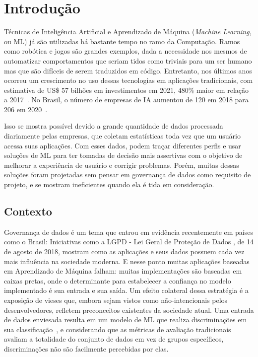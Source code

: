 \documentclass[portugues]{ic-tese}
\begin{document}
\mainmatter


\chapter{Introdução}


Técnicas de Inteligência Artificial e Aprendizado de Máquina (\textit{Machine Learning}, ou ML) já são utilizadas há bastante tempo no ramo da Computação. Ramos como robótica e jogos são grandes exemplos, dada a necessidade nos mesmos de automatizar comportamentos que seriam tidos como triviais para um ser humano mas que são difíceis de serem traduzidos em código. Entretanto, nos últimos anos ocorreu um crescimento no uso dessas tecnologias em aplicações tradicionais, com estimativa de US\$ 57 bilhões em investimentos em 2021, 480\% maior em relação a 2017~\citep{Deloitte_2018}. No Brasil, o número de empresas de IA aumentou de 120 em 2018 para 206 em 2020~\citep{CIO_2021}.

Isso se mostra possível devido a grande quantidade de dados processada diariamente pelas empresas, que coletam estatísticas toda vez que um usuário acessa suas aplicações. Com esses dados, podem traçar diferentes perfis e usar soluções de ML para ter tomadas de decisão mais assertivas com o objetivo de melhorar a experiência de usuário e corrigir problemas. Porém, muitas dessas soluções foram projetadas sem pensar em governança de dados como requisito de projeto, e se mostram ineficientes quando ela é tida em consideração.

\section{Contexto}

Governança de dados é um tema que entrou em evidência recentemente em países como o Brasil: Iniciativas como a LGPD - Lei Geral de Proteção de Dados \citep{LGPD_2021}, de 14 de agosto de 2018, mostram como as aplicações e seus dados possuem cada vez mais influência na sociedade moderna. E nesse ponto muitas aplicações baseadas em Aprendizado de Máquina falham: muitas implementações são baseadas em caixas pretas, onde o determinante para estabelecer a confiança no modelo implementado é sua entrada e sua saída. Um efeito colateral dessa estratégia é a exposição de vieses que, embora sejam vistos como não-intencionais pelos desenvolvedores, refletem preconceitos existentes da sociedade atual. Uma entrada de dados enviesada resulta em um modelo de ML que realiza discriminações em sua classificação~\citep{Buolamwini_2018}, e considerando que as métricas de avaliação tradicionais avaliam a totalidade do conjunto de dados em vez de grupos específicos, discriminações não são facilmente percebidas por elas.
\end{document}
